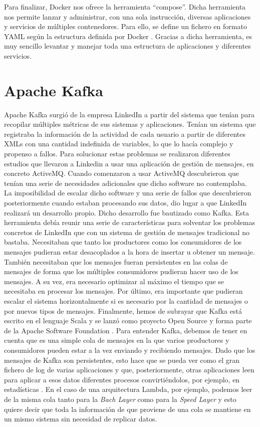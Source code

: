Para finalizar, Docker nos ofrece la herramienta “compose”. Dicha
herramienta nos permite lanzar y administrar, con una sola instrucción,
diversas aplicaciones y servicios de múltiples contenedores. Para ello, se
define un fichero en formato YAML según la estructura definida por Docker
\cite{Dck-13}. Gracias a dicha herramienta, es muy sencillo levantar y
manejar toda una estructura de aplicaciones y diferentes servicios.



\section{Apache Kafka\label{Kafka}}

Apache Kafka surgió de la empresa LinkedIn a partir del sistema que tenían
para recopilar múltiples métricas de sus sistemas y aplicaciones. Tenían un
sistema que registraba la información de la actividad de cada usuario a
partir de diferentes XMLs con una cantidad indefinida de variables, lo que
lo hacía complejo y propenso a fallos. Para solucionar estas problemas se
realizaron diferentes estudios que llevaron a Linkedin a usar una
aplicación de gestión de mensajes, en concreto ActiveMQ. Cuando comenzaron
a usar ActiveMQ descubrieron que tenían una serie de necesidades
adicionales que dicho software no contemplaba. La imposibilidad de escalar
dicho software y una serie de fallos que descubrieron posteriormente cuando
estaban procesando sus datos, dio lugar a que LinkedIn realizará un
desarrollo propio. Dicho desarrollo fue bautizado como Kafka. Esta
herramienta debía reunir una serie de características para solventar los
problemas concretos de LinkedIn que con un sistema de gestión de mensajes
tradicional no bastaba. Necesitaban que tanto los productores como los
consumidores de los mensajes pudieran estar desacoplados a la hora de
insertar u obtener un mensaje. También necesitaban que los mensajes fueran
persistentes en las colas de mensajes de forma que los múltiples
consumidores pudieran hacer uso de los mensajes. A su vez, era necesario
optimizar al máximo el tiempo que se necesitaba en procesar los mensajes.
Por último, era importante que pudieran escalar el sistema horizontalmente
si es necesario por la cantidad de mensajes o por nuevos tipos de mensajes.
Finalmente, hemos de subrayar que Kafka está escrito en el lenguaje Scala y
se lanzó como proyecto Open Source y forma parte de la Apache Software
Foundation \cite{Kfk-1}. Para entender Kafka, debemos de tener en cuenta
que es una simple cola de mensajes en la que varios productores y
consumidores pueden estar a la vez enviando y recibiendo mensajes. Dado que
los mensajes de Kafka son persistentes, esto hace que se pueda ver como el
gran fichero de log de varias aplicaciones y que, posteriormente, otras
aplicaciones leen para aplicar a esos datos diferentes procesos
convirtiéndolos, por ejemplo, en estadísticas \cite{Kfk-6}. En el caso de
una arquitectura Lambda, por ejemplo, podemos leer de la misma cola tanto
para la \emph{Bach Layer} como para la \emph{Speed Layer} y esto quiere
decir que toda la información de que proviene de una cola se mantiene en un
mismo sistema sin necesidad de replicar datos.

